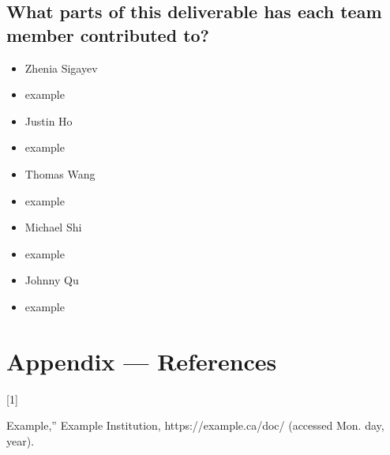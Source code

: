 \documentclass[12pt]{article}
\begin{document}
  \subsection{What parts of this deliverable has each team member contributed to?}
  \begin{itemize}
    \item Zhenia Sigayev
      \item example
    \item Justin Ho
      \item example
    \item Thomas Wang
      \item example
    \item Michael Shi
      \item example
    \item Johnny Qu
      \item example
  \end{itemize}

\section*{Appendix --- References}
    \hypertarget{Ref1}{[1]} Example,” Example Institution, https://example.ca/doc/ (accessed Mon. day, year). \\



\end{document}
